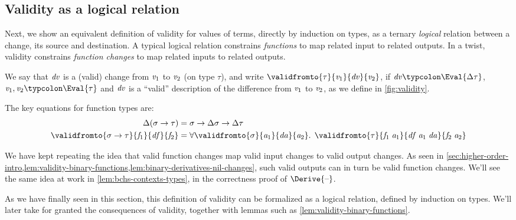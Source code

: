 
\subsection{Validity as a logical relation}
\label{sec:validity-logical}

Next, we show an equivalent definition of validity for values of terms, directly
by induction on types, as a ternary
\emph{logical} relation between a change, its source and
destination. A typical logical relation constrains \emph{functions} to
map related input to related outputs. In a twist, validity constrains
\emph{function changes} to map related inputs to related outputs.
\begin{definition}
  \label{def:ch-validity}
We say that \ensuremath{\Varid{dv}} is a (valid) change from \ensuremath{\Varid{v}_{1}} to \ensuremath{\Varid{v}_{2}} (on type \ensuremath{\tau}), and write
\ensuremath{\validfromto{\tau}{\Varid{v}_{1}}{\Varid{dv}}{\Varid{v}_{2}}}, if \ensuremath{\Varid{dv}\typcolon\Eval{\Delta \tau}}, \ensuremath{\Varid{v}_{1},\Varid{v}_{2}\typcolon\Eval{\tau}} and \ensuremath{\Varid{dv}} is a ``valid'' description of the difference
from \ensuremath{\Varid{v}_{1}} to \ensuremath{\Varid{v}_{2}}, as we define in \cref{fig:validity}.
\end{definition}

The key equations for function types are:
\begin{align*}
  \ensuremath{\Delta (\sigma\to \tau)} &= \ensuremath{\sigma\to \Delta \sigma\to \Delta \tau}\\
  \ensuremath{\validfromto{\sigma\to \tau}{\Varid{f}_{1}}{\Varid{df}}{\Varid{f}_{2}}} &=
  \ensuremath{\forall \validfromto{\sigma}{\Varid{a}_{1}}{\Varid{da}}{\Varid{a}_{2}}\hsforall \hsdot{\circ }{\mathpunct{.}}\;\validfromto{\tau}{\Varid{f}_{1}\;\Varid{a}_{1}}{\Varid{df}\;\Varid{a}_{1}\;\Varid{da}}{\Varid{f}_{2}\;\Varid{a}_{2}}}
\end{align*}

\begin{remark}
  \label{rem:validity-logical-recursion}
  We have kept repeating the idea that valid function changes map valid input
  changes to valid output changes. As seen in
  \cref{sec:higher-order-intro,lem:validity-binary-functions,lem:binary-derivatives-nil-changes},
  such valid outputs can in turn be valid function changes. We'll see the same
  idea at work in \cref{lem:bchs-contexts-types}, in the correctness proof of
  \ensuremath{\Derive{\text{\textendash}}}.

  As we have finally seen in this section, this definition of validity can be
  formalized as a logical relation, defined by induction on types. We'll later
  take for granted the consequences of validity, together with lemmas such as
  \cref{lem:validity-binary-functions}.
\end{remark}

